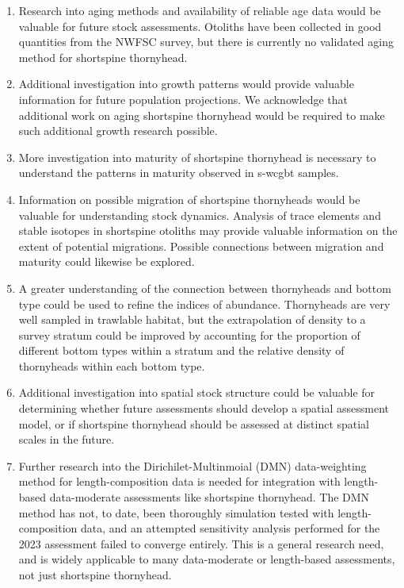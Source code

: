 \documentclass[11pt,
  letterpaper,
]{article}
\providecommand{\tightlist}{%
  \setlength{\itemsep}{0pt}\setlength{\parskip}{0pt}}
\providecommand{\tightlist}{%
  \setlength{\itemsep}{0pt}\setlength{\parskip}{0pt}}
\begin{document}
\begin{enumerate}
\def\labelenumi{\arabic{enumi}.}
\tightlist
\item
  Research into aging methods and availability of reliable age data would be valuable for future stock assessments. Otoliths have been collected in good quantities from the NWFSC survey, but there is currently no validated aging method for shortspine thornyhead.
\item
  Additional investigation into growth patterns would provide valuable information for future population projections. We acknowledge that additional work on aging shortspine thornyhead would be required to make such additional growth research possible.
\item
  More investigation into maturity of shortspine thornyhead is necessary to understand the patterns in maturity observed in \gls{s-wcgbt} samples.
\item
  Information on possible migration of shortspine thornyheads would be valuable for understanding stock dynamics. Analysis of trace elements and stable isotopes in shortspine otoliths may provide valuable information on the extent of potential migrations. Possible connections between migration and maturity could likewise be explored.
\item
  A greater understanding of the connection between thornyheads and bottom type could be used to refine the indices of abundance. Thornyheads are very well sampled in trawlable habitat, but the extrapolation of density to a survey stratum could be improved by accounting for the proportion of different bottom types within a stratum and the relative density of thornyheads within each bottom type.
\item
  Additional investigation into spatial stock structure could be valuable for determining whether future assessments should develop a spatial assessment model, or if shortspine thornyhead should be assessed at distinct spatial scales in the future.
\item
  Further research into the Dirichilet-Multinmoial (DMN) data-weighting method for length-composition data is needed for integration with length-based data-moderate assessments like shortspine thornyhead. The DMN method has not, to date, been thoroughly simulation tested with length-composition data, and an attempted sensitivity analysis performed for the 2023 assessment failed to converge entirely. This is a general research need, and is widely applicable to many data-moderate or length-based assessments, not just shortspine thornyhead.
\end{enumerate}
\end{document}
